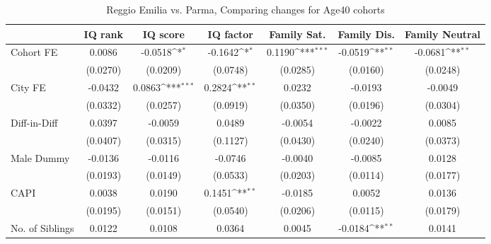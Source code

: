 \begin{table}[htbp]\centering
\def\sym#1{\ifmmode^{#1}\else\(^{#1}\)\fi}
\caption{Reggio Emilia vs. Parma, Comparing changes for Age40 cohorts}
\begin{tabular}{l*{6}{c}}
\toprule
            &\multicolumn{1}{c}{IQ rank}&\multicolumn{1}{c}{IQ score}&\multicolumn{1}{c}{IQ factor}&\multicolumn{1}{c}{Family Sat.}&\multicolumn{1}{c}{Family Dis.}&\multicolumn{1}{c}{Family Neutral}\\
\midrule
Cohort FE   &      0.0086         &     -0.0518\sym{*}  &     -0.1642\sym{*}  &      0.1190\sym{***}&     -0.0519\sym{**} &     -0.0681\sym{**} \\
            &    (0.0270)         &    (0.0209)         &    (0.0748)         &    (0.0285)         &    (0.0160)         &    (0.0248)         \\
\addlinespace
City FE     &     -0.0432         &      0.0863\sym{***}&      0.2824\sym{**} &      0.0232         &     -0.0193         &     -0.0049         \\
            &    (0.0332)         &    (0.0257)         &    (0.0919)         &    (0.0350)         &    (0.0196)         &    (0.0304)         \\
\addlinespace
Diff-in-Diff&      0.0397         &     -0.0059         &      0.0489         &     -0.0054         &     -0.0022         &      0.0085         \\
            &    (0.0407)         &    (0.0315)         &    (0.1127)         &    (0.0430)         &    (0.0240)         &    (0.0373)         \\
\addlinespace
Male Dummy  &     -0.0136         &     -0.0116         &     -0.0746         &     -0.0040         &     -0.0085         &      0.0128         \\
            &    (0.0193)         &    (0.0149)         &    (0.0533)         &    (0.0203)         &    (0.0114)         &    (0.0177)         \\
\addlinespace
CAPI        &      0.0038         &      0.0190         &      0.1451\sym{**} &     -0.0185         &      0.0052         &      0.0136         \\
            &    (0.0195)         &    (0.0151)         &    (0.0540)         &    (0.0206)         &    (0.0115)         &    (0.0179)         \\
\addlinespace
No. of Siblings&      0.0122         &      0.0108         &      0.0364         &      0.0045         &     -0.0184\sym{**} &      0.0141         \\

\end{tabular}
\end{table}
